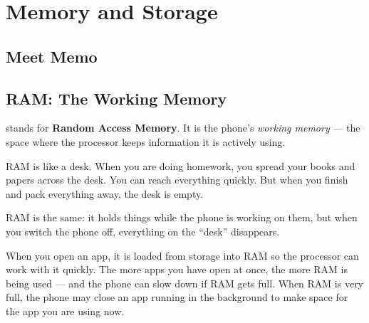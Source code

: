 
\chapter{Memory and Storage}


\section*{Meet Memo}


\sectionrule

\section*{RAM: The Working Memory}

 stands for \textbf{Random Access Memory}.
It is the phone's \emph{working memory} — the space where the processor
keeps information it is actively using.

\begin{picturethis}
  RAM is like a desk.
  When you are doing homework, you spread your books and papers across the desk.
  You can reach everything quickly.
  But when you finish and pack everything away, the desk is empty.

  RAM is the same: it holds things while the phone is working on them,
  but when you switch the phone off, everything on the ``desk'' disappears.
\end{picturethis}

When you open an app, it is loaded from storage into RAM so the processor
can work with it quickly. The more apps you have open at once,
the more RAM is being used — and the phone can slow down if RAM gets full.
When RAM is very full, the phone may close an app running in the background
to make space for the app you are using now.

